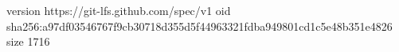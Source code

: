 version https://git-lfs.github.com/spec/v1
oid sha256:a97df03546767f9cb30718d355d5f44963321fdba949801cd1c5e48b351e4826
size 1716
